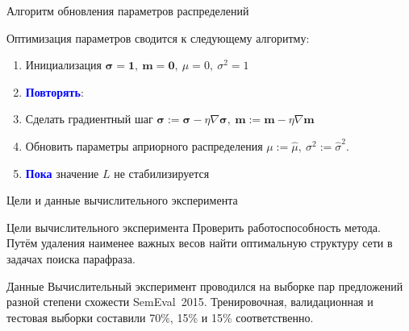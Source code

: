 \documentclass{beamer}
\newcommand{\bm}{{\textbf{m}}}
\newcommand{\bs}{{\boldsymbol{\sigma}}}
\begin{document}
\begin{frame}{Алгоритм обновления параметров распределений}

Оптимизация параметров сводится к следующему алгоритму:

\begin{enumerate}
	\item Инициализация $\bs = \textbf{1}, \ \bm = \textbf{0}, \ \mu = 0, \ \sigma^2 = 1$
	
	\item \textcolor{blue}{\textbf{Повторять}}:
	
	\item Сделать градиентный шаг $\bs:=\bs-\eta\nabla\bs, \ \bm:=\bm-\eta\nabla\bm$
	
	\item Обновить параметры априорного распределения $\mu:= \hat{\mu}, \ \sigma^2:=\hat{\sigma}^2$.
	
	\item \textcolor{blue}{\textbf{Пока}} значение $L$ не стабилизируется
	

\end{enumerate}

\end{frame}

\begin{frame}{Цели и данные вычислительного эксперимента}

\begin{block}{Цели вычислительного эксперимента}
Проверить работоспособность метода. Путём удаления наименее важных весов найти оптимальную структуру сети в задачах поиска парафраза.
\end{block}

\begin{block}{Данные}
Вычислительный эксперимент проводился на выборке пар предложений разной степени схожести SemEval~2015. Тренировочная, валидационная и тестовая выборки составили 70\%, 15\% и 15\% соответственно.
\end{block}

\end{frame}

%
%
%
%
\end{document}

